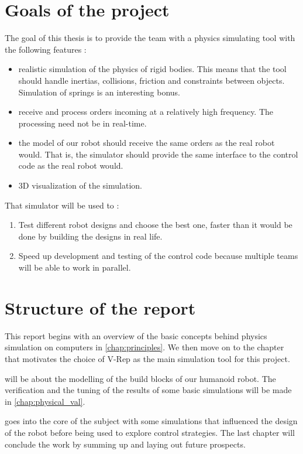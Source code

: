 \section{Goals of the project}
The goal of this thesis is to provide the team with a physics simulating tool with the following features :
\begin{itemize}
\item realistic simulation of the physics of rigid bodies. This means that the tool should handle inertias, collisions, friction and constraints between objects. Simulation of springs is an interesting bonus.
\item receive and process orders incoming at a relatively high frequency. The processing need not be in real-time.
\item the model of our robot should receive the same orders as the real robot would. That is, the simulator should provide the same interface to the control code as the real robot would. 
\item 3D visualization of the simulation.
\end{itemize}

That simulator will be used to :
\begin{enumerate}
\item Test different robot designs and choose the best one, faster than it would be done by building the designs in real life.
\item Speed up development and testing of the control code because multiple teams will be able to work in parallel. 
\end{enumerate}

\section{Structure of the report}
This report begins with an overview of the basic concepts behind physics simulation on computers in \cref{chap:principles}. We then move on to the chapter that motivates the choice of V-Rep as the main simulation tool for this project.

 will be about the modelling of the build blocks of our humanoid robot. The verification and the tuning of the results of some basic simulations will be made in \cref{chap:physical_val}.

 goes into the core of the subject with some simulations that influenced the design of the robot before being used to explore control strategies. The last chapter will conclude the work by summing up and laying out future prospects.